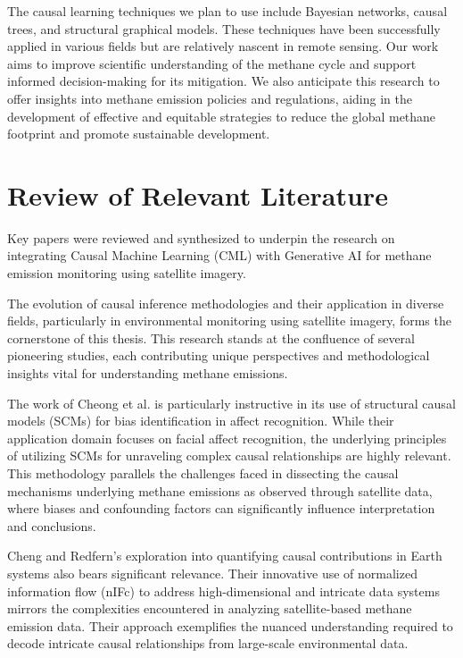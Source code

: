 The causal learning techniques we plan to use include Bayesian networks, causal trees, and structural graphical models. These techniques have been successfully applied in various fields but are relatively nascent in remote sensing. Our work aims to improve scientific understanding of the methane cycle and support informed decision-making for its mitigation. We also anticipate this research to offer insights into methane emission policies and regulations, aiding in the development of effective and equitable strategies to reduce the global methane footprint and promote sustainable development.








\section{Review of Relevant Literature}
Key papers were reviewed and synthesized to underpin the research on integrating Causal Machine Learning (CML) with Generative AI for methane emission monitoring using satellite imagery.

The evolution of causal inference methodologies and their application in diverse fields, particularly in environmental monitoring using satellite imagery, forms the cornerstone of this thesis. This research stands at the confluence of several pioneering studies, each contributing unique perspectives and methodological insights vital for understanding methane emissions.

The work of Cheong et al. \cite{cheong2023} is particularly instructive in its use of structural causal models (SCMs) for bias identification in affect recognition. While their application domain focuses on facial affect recognition, the underlying principles of utilizing SCMs for unraveling complex causal relationships are highly relevant. This methodology parallels the challenges faced in dissecting the causal mechanisms underlying methane emissions as observed through satellite data, where biases and confounding factors can significantly influence interpretation and conclusions.

Cheng and Redfern’s exploration into quantifying causal contributions in Earth systems \cite{cheng2021} also bears significant relevance. Their innovative use of normalized information flow (nIFc) to address high-dimensional and intricate data systems mirrors the complexities encountered in analyzing satellite-based methane emission data. Their approach exemplifies the nuanced understanding required to decode intricate causal relationships from large-scale environmental data.

